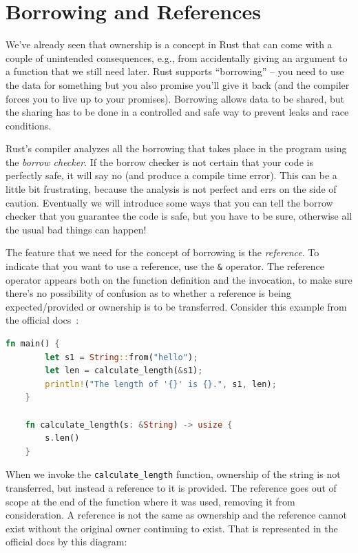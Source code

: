 




\section*{Borrowing and References}
We've already seen that ownership is a concept in Rust that can come with a couple of unintended consequences, e.g., from accidentally giving an argument to a function that we still need later. Rust supports ``borrowing'' -- you need to use the data for something but you also promise you'll give it back (and the compiler forces you to live up to your promises). Borrowing allows data to be shared, but the sharing has to be done in a controlled and safe way to prevent leaks and race conditions.

Rust's compiler analyzes all the borrowing that takes place in the program using the \textit{borrow checker}. If the borrow checker is not certain that your code is perfectly safe, it will say no (and produce a compile time error). This can be a little bit frustrating, because the analysis is not perfect and errs on the side of caution. Eventually we will introduce some ways that you can tell the borrow checker that you guarantee the code is safe, but you have to be sure, otherwise all the usual bad things can happen!

The feature that we need for the concept of borrowing is the \textit{reference}. To indicate that you want to use a reference, use the \texttt{\&} operator. The reference operator appears both on the function definition and the invocation, to make sure there's no possibility of confusion as to whether a reference is being expected/provided or ownership is to be transferred.  Consider this example from the official docs~\cite{rustdocs}:

\begin{lstlisting}[language=Rust]
    fn main() {
        let s1 = String::from("hello");
        let len = calculate_length(&s1);
        println!("The length of '{}' is {}.", s1, len);
    }

    fn calculate_length(s: &String) -> usize {
        s.len()
    }
\end{lstlisting}

When we invoke the \texttt{calculate\_length} function, ownership of the string is not transferred, but instead a reference to it is provided. The reference goes out of scope at the end of the function where it was used, removing it from consideration. A reference is not the same as ownership and the reference cannot exist without the original owner continuing to exist. That is represented in the official docs by this diagram:

